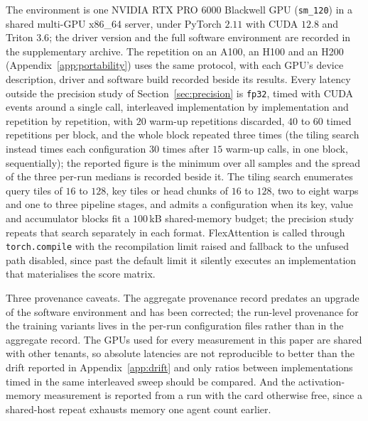 The environment is one NVIDIA RTX PRO 6000 Blackwell GPU
(\texttt{sm\_120}) in a shared multi-GPU x86\_64 server, under PyTorch $2.11$
with CUDA $12.8$ and Triton $3.6$; the driver version and the full software
environment are recorded in the supplementary archive. The repetition on an
A100, an H100 and an H200 (Appendix~\ref{app:portability}) uses the same
protocol, with each GPU's device description, driver and software build recorded
beside its results. Every latency outside the precision study of
Section~\ref{sec:precision} is \texttt{fp32}, timed with CUDA events
around a single call, interleaved implementation by implementation and
repetition by repetition, with $20$ warm-up repetitions discarded, $40$ to $60$
timed repetitions per block, and the whole block repeated three times (the tiling search instead times each configuration $30$ times after $15$ warm-up calls, in one block, sequentially); the
reported figure is the minimum over all samples and the spread of the three
per-run medians is recorded beside it. The tiling search enumerates query tiles
of $16$ to $128$, key tiles or head chunks of $16$ to $128$, two to eight warps
and one to three pipeline stages, and admits a configuration when its key,
value and accumulator blocks fit a $100$\,kB shared-memory budget; the
precision study repeats that search separately in each format. FlexAttention is
called through \texttt{torch.compile} with the recompilation limit raised and
fallback to the unfused path disabled, since past the default limit it silently
executes an implementation that materialises the score matrix.

Three provenance caveats. The aggregate provenance record predates an upgrade of the
software environment and has been corrected; the run-level provenance for the training variants lives in
the per-run configuration files rather than in the aggregate record. The GPUs
used for every measurement in this paper are shared with other tenants, so
absolute latencies are not reproducible to better than the drift reported in
Appendix~\ref{app:drift} and only ratios between implementations timed in the
same interleaved sweep should be compared. And the activation-memory measurement
is reported from a run with the card otherwise free, since a shared-host repeat
exhausts memory one agent count earlier.
